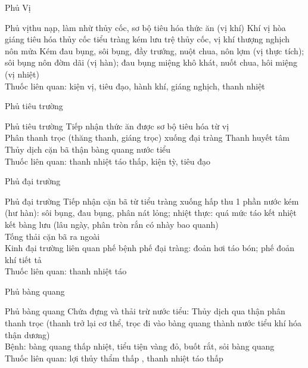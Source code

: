 \documentclass[
	11pt, %
]{beamer}
\theoremstyle{newblock}
\begin{document}
\begin{frame}
	\Huge{Phủ Vị}
\end{frame}
\begin{frame}{Phủ vị}{thu nạp, làm nhừ thủy cốc, sơ 	bộ tiêu hóa thức ăn (vị khí) Khí vị hòa giáng   tiêu hóa thủy cốc   tiểu 	tràng   kém   lưu  trệ  thủy  cốc,  vị  khí 	thượng nghịch   nôn mửa}
Kém   đau  bụng,  sôi  bụng,  đầy  trướng, 	nuột chua, nôn lợm (vị thực tích); sôi bụng 	nôn đờm dãi (vị hàn); đau bụng miệng khô 	khát, nuốt chua, hôi miệng (vị nhiệt)\\
Thuốc liên quan: kiện vị, tiêu đạo, hành khí, 	giáng nghịch, thanh nhiệt
\end{frame}
\begin{frame}
	\Huge{Phủ tiêu trường}
\end{frame}
\begin{frame}{Phủ tiêu trường}
Tiếp nhận thức ăn được sơ bộ tiêu hóa từ vị\\
Phân	thanh	trọc	(thăng	thanh, giáng trọc)   xuống đại tràng
Thanh  huyết   tâm\\
Thủy	dịch	cặn	bã	 	thận bàng quang   nước tiểu\\
Thuốc liên quan: thanh nhiệt táo thấp, kiện tỳ, tiêu đạo\\
\end{frame}
\begin{frame}
	\Huge{Phủ đại trường}
\end{frame}
\begin{frame}{Phủ đại trường}
	Tiếp  nhận  cặn  bã  từ  tiểu  tràng 	xuống  hấp thu 1 phần nước  	kém (hư hàn): sôi bụng, đau bụng, 	phân nát lỏng; nhiệt thực: quá mức táo  kết    nhiệt  kết  bàng  lưu (lâu ngày, phân tròn rắn có nhày bao quanh)\\
Tống thải cặn bã ra ngoài\\
Kinh đại trường liên quan phế  	bệnh phế  đại tràng: đoản hơi  	táo bón; phế đoản khí  tiết tả\\
Thuốc  liên  quan:  thanh  nhiệt  táo\\
\end{frame}
\begin{frame}
	\Huge{Phủ bàng quang}
\end{frame}
\begin{frame}{Phủ bàng quang}
	Chứa  đựng  và  thải  trừ  nước 	tiểu:  Thủy  dịch  qua  thận  phân 	thanh trọc (thanh trở lại cơ thể, 	trọc  đi  vào  bàng  quang  thành 	nước  tiểu    khí  hóa    thận 	dương)\\
Bệnh:  bàng  quang  thấp  nhiệt, 	tiểu tiện vàng đỏ, buốt rắt, sỏi 	bàng quang\\
Thuốc liên quan: lợi thủy thẩm thấp , thanh nhiệt táo thấp\\
\end{frame}
\end{document}
